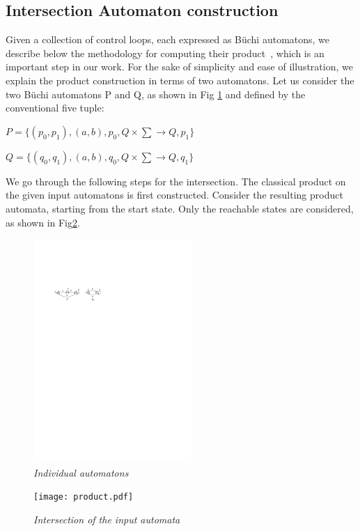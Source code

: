 \subsection{Intersection Automaton construction}
\noindent
Given a collection of control loops, each expressed as B\"{u}chi automatons, we describe below the methodology for computing their product~\cite{DBLP:books/ws/automata2012/ChevalierDMP12}, which is an important step in our work. For the sake of simplicity and ease of illustration, we explain the product construction in terms of two automatons. 
Let us consider the two B\"{u}chi automatons P and Q, as shown in Fig \ref{fig1} and defined by the
conventional five tuple:

$P = \{(p_0,p_1),(a,b),p_0, Q \times \sum \rightarrow Q,p_1\}$

$Q = \{(q_0,q_1),(a,b),q_0, Q \times \sum \rightarrow Q,q_1\}$


\noindent
We go through the 
following steps for the intersection. 
The classical product on the given input automatons is first constructed. Consider the resulting product automata, starting from the start state. Only the reachable states are considered, as shown in Fig\ref{product}.

\begin{figure}
\begin{center}
\includegraphics[width=60mm]{example_1.pdf}
\end{center}
\caption{{\em Individual automatons}} \label{fig1}
\end{figure}

 \begin{figure}
\begin{center}
\texttt{[image: product.pdf]}
\end{center}
\caption{{\em Intersection of the input automata}}
\label{product}
\end{figure}
 
